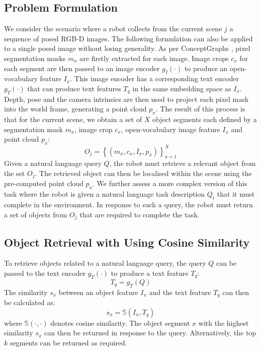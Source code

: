 \subsection{Problem Formulation}
\label{prob_form}
We consider the scenario where a robot collects from the current scene $j$ a sequence of posed RGB-D images. The following formulation can also be applied to a single posed image without losing generality. As per ConceptGraphs \cite{conceptgraphs}, pixel segmentation masks $m_{x}$ are firstly extracted for each image. Image crops $c_{x}$ for each segment are then passed to an image encoder $g_{I}\left(\cdot \right)$ to produce an open-vocabulary feature $I_{x}$. This image encoder has a corresponding text encoder $g_{T}\left(\cdot \right)$ that can produce text features $T_{q}$ in the same embedding space as $I_{x}$. Depth, pose and the camera intrinsics are then used to project each pixel mask into the world frame, generating a point cloud $p_{x}$. The result of this process is that for the current scene, we obtain a set of $X$ object segments each defined by a segmentation mask $m_{x}$, image crop $c_{x}$, open-vocabulary image feature $I_{x}$ and point cloud $p_{x}$:
\begin{equation}
    O_{j} = \left\{\left( m_{x}, c_{x}, I_{x}, p_{x} \right)\right\}^{X}_{x=1}
\end{equation}
Given a natural language query $Q$, the robot must retrieve a relevant object from the set $O_{j}$. The retrieved object can then be localised within the scene using the pre-computed point cloud $p_{x}$. We further assess a more complex version of this task where the robot is given a natural language task description $Q_{t}$ that it must complete in the environment. In response to such a query, the robot must return a set of objects from $O_{j}$ that are required to complete the task.

\subsection{Object Retrieval with Using Cosine Similarity}
\label{sec:retrieval}
To retrieve objects related to a natural language query, the query $Q$ can be passed to the text encoder $g_{T}\left(\cdot \right)$ to produce a text feature $T_q$:
\begin{equation}
    T_q = g_{T}\left(Q \right)
    \label{eq:text_encoder}
\end{equation}
The similarity $s_x$ between an object feature $I_x$ and the text feature $T_q$ can then be calculated as:
\begin{equation}
    s_x = \mathbb{S}(I_x, T_q)
    \label{eq:cosine_sim}
\end{equation}
where $\mathbb{S}(\cdot, \cdot)$  denotes cosine similarity. The object segment $x$ with the highest similarity $s_x$ can then be returned in response to the query. Alternatively, the top $k$ segments can be returned as required.

